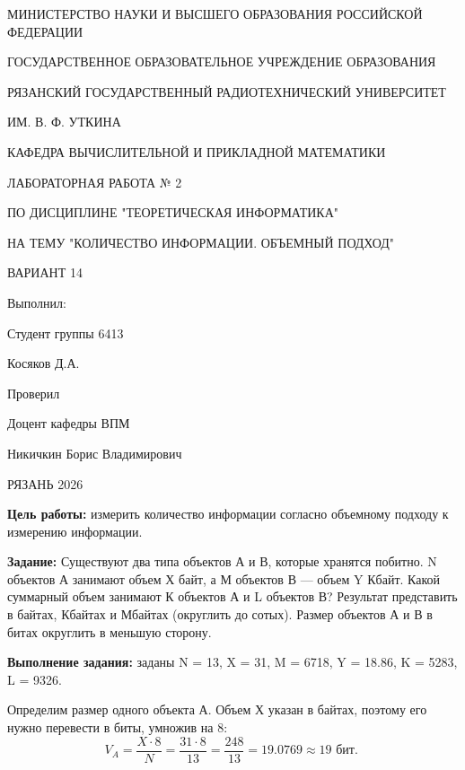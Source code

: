 \documentclass[a4paper, 12pt]{article}
\begin{document}
\begin{center}
    МИНИСТЕРСТВО НАУКИ И ВЫСШЕГО ОБРАЗОВАНИЯ РОССИЙСКОЙ ФЕДЕРАЦИИ

    ГОСУДАРСТВЕННОЕ ОБРАЗОВАТЕЛЬНОЕ УЧРЕЖДЕНИЕ ОБРАЗОВАНИЯ

    РЯЗАНСКИЙ ГОСУДАРСТВЕННЫЙ РАДИОТЕХНИЧЕСКИЙ УНИВЕРСИТЕТ 

    ИМ. В. Ф. УТКИНА

    КАФЕДРА ВЫЧИСЛИТЕЛЬНОЙ И ПРИКЛАДНОЙ МАТЕМАТИКИ 
\end{center}

\vspace{5 cm}

\begin{center}
    ЛАБОРАТОРНАЯ РАБОТА № 2

    ПО ДИСЦИПЛИНЕ "ТЕОРЕТИЧЕСКАЯ ИНФОРМАТИКА"

    НА ТЕМУ "КОЛИЧЕСТВО ИНФОРМАЦИИ. ОБЪЕМНЫЙ ПОДХОД"

    ВАРИАНТ 14

\end{center}

\vspace{7 cm}

\begin{flushright}
    Выполнил:

    Студент группы 6413

    Косяков Д.А.

    Проверил

    Доцент кафедры ВПМ

    Никичкин Борис Владимирович
\end{flushright}

\begin{center}
    РЯЗАНЬ 2026
\end{center}

\pagebreak

\textbf{ Цель работы:} измерить количество информации согласно объемному подходу к измерению информации.

\textbf{ Задание:} Существуют два типа объектов А и В, которые хранятся побитно. N объектов А занимают объем Х байт, а М объектов В --- 
объем Y Кбайт.
Какой суммарный объем занимают К объектов А и L объектов В? Результат представить в байтах, Кбайтах и Мбайтах (округлить до сотых).
Размер объектов А и В в битах округлить в меньшую сторону.

\textbf{ Выполнение задания:} заданы N = 13, X = 31, M = 6718, Y = 18.86, K = 5283, L = 9326. 

Определим размер одного объекта А. Объем Х указан в байтах, поэтому его нужно перевести в биты, умножив на 8: 
$$V_A = \frac{X \cdot 8}{N} = \frac{31 \cdot 8}{13} =  \frac{248}{13} = 19.0769 \approx 19 \text{ бит. }$$
\end{document}
